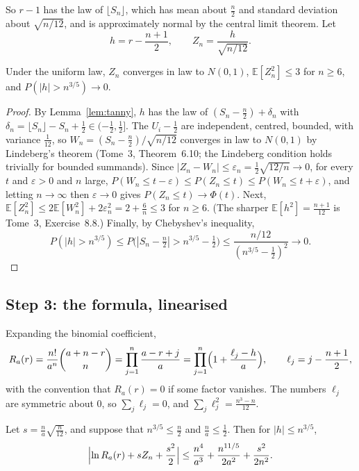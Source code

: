 So $r-1$ has the law of $\lfloor S_n\rfloor$, which has mean about $\frac n2$ and standard deviation about $\sqrt{n/12}$, and is approximately normal by the central limit
theorem. Let
\[
h=r-\frac{n+1}2,\qquad Z_n=\frac h{\sqrt{n/12}}.
\]

\begin{lemma}\label{lem:risingclt}
Under the uniform law, $Z_n$ converges in law to $N(0,1)$, $\mathbb E[Z_n^2]\le3$ for $n\ge6$, and $P(|h|>n^{3/5})\to0$.
\end{lemma}

\begin{proof}
By Lemma~\ref{lem:tanny}, $h$ has the law of $(S_n-\frac n2)+\delta_n$ with $\delta_n=\lfloor S_n\rfloor-S_n+\frac12\in(-\frac12,\frac12]$. The $U_i-\frac12$ are independent, centred, bounded, with variance
$\frac1{12}$, so $W_n=(S_n-\frac n2)/\sqrt{n/12}$ converges in law to $N(0,1)$ by Lindeberg's theorem (Tome~3, Theorem~6.10; the Lindeberg condition holds trivially for
bounded summands). Since $|Z_n-W_n|\le\varepsilon_n=\frac12\sqrt{12/n}\to0$, for every $t$ and $\varepsilon>0$ and $n$ large, $P(W_n\le t-\varepsilon)\le P(Z_n\le t)\le P(W_n\le t+\varepsilon)$, and letting
$n\to\infty$ then $\varepsilon\to0$ gives $P(Z_n\le t)\to\Phi(t)$. Next, $\mathbb E[Z_n^2]\le2\mathbb E[W_n^2]+2\varepsilon_n^2=2+\frac6n\le3$ for $n\ge6$. (The sharper $\mathbb E[h^2]=\frac{n+1}{12}$ is Tome~3, Exercise~8.8.) Finally, by Chebyshev's inequality,
\[
P(|h|>n^{3/5})\le P\bigl(|S_n-\tfrac n2|>n^{3/5}-\tfrac12\bigr)\le\frac{n/12}{(n^{3/5}-\frac12)^2}\longrightarrow0.
\]
\end{proof}

\subsection*{Step 3: the formula, linearised}

Expanding the binomial coefficient,
\[
R_a(r)=\frac{n!}{a^n}\binom{a+n-r}n=\prod_{j=1}^n\frac{a-r+j}a=\prod_{j=1}^n\Bigl(1+\frac{\ell_j-h}a\Bigr),\qquad\ell_j=j-\frac{n+1}2,
\]
with the convention that $R_a(r)=0$ if some factor vanishes. The numbers $\ell_j$ are symmetric about $0$, so $\sum_j\ell_j=0$, and $\sum_j\ell_j^2=\frac{n^3-n}{12}$.

\begin{lemma}\label{lem:linearise}
Let $s=\frac{n}{a}\sqrt{\frac n{12}}$, and suppose that $n^{3/5}\le\frac n2$ and $\frac na\le\frac12$. Then for $|h|\le n^{3/5}$,
\[
\Bigl|\ln R_a(r)+sZ_n+\frac{s^2}2\Bigr|\le\frac{n^4}{a^3}+\frac{n^{11/5}}{2a^2}+\frac{s^2}{2n^2}.
\]
\end{lemma}


